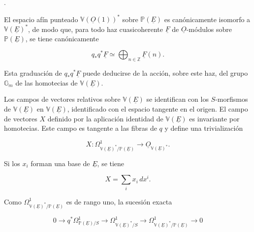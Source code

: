 \begin{center}
\qquad .
\end{center}

El espacio afín punteado $\mathbb V(\underline O(1))^*$ sobre
$\mathbb P(\underline E)$ es canónicamente isomorfo a
$\mathbb V(\underline E)^*$, de modo que, para todo haz cuasicoherente
$\underline F$ de $\underline O$-módulos sobre $\mathbb P(\underline E)$,
se tiene canónicamente

\pageoriginale

\begin{equation}\tag{1.1.1}
q_*q^*\underline F\simeq
\bigoplus_{n\in\mathbb Z}\underline F(n).
\end{equation}

Esta graduación de $q_*q^*\underline F$ puede deducirse de la acción, sobre
este haz, del grupo $\mathbb G_m$ de las homotecias de
$\mathbb V(\underline E)$.

Los campos de vectores relativos sobre $\mathbb V(\underline E)$ se
identifican con los $S$-morfismos de $\mathbb V(\underline E)$ en
$\mathbb V(\underline E)$, identificado con el espacio tangente en el
origen. El campo de vectores $X$ definido por la aplicación identidad de
$\mathbb V(\underline E)$ es invariante por homotecias. Este campo es
tangente a las fibras de $q$ y define una trivialización

\begin{equation}\tag{1.1.2}
X:\Omega^1_{\mathbb V(\underline E)^*/\mathbb P(\underline E)}
\longrightarrow\underline O_{\mathbb V(\underline E)^*}.
\end{equation}

Si los $x_i$ forman una base de $\underline E$, se tiene

\begin{equation*}
X=\sum_i x_i\,dx^i.
\end{equation*}

Como $\Omega^1_{\mathbb V(\underline E)^*/\mathbb P(\underline E)}$ es de
rango uno, la sucesión exacta

\begin{equation*}
0\longrightarrow q^*\Omega^1_{\mathbb P(\underline E)/S}
\longrightarrow\Omega^1_{\mathbb V(\underline E)^*/S}
\longrightarrow
\Omega^1_{\mathbb V(\underline E)^*/\mathbb P(\underline E)}
\longrightarrow0
\end{equation*}

